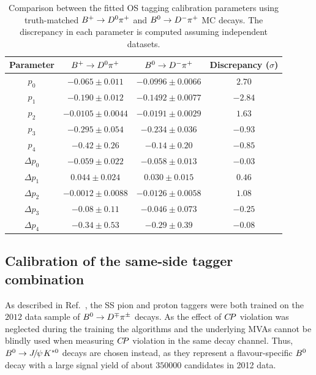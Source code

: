 \begin{table}[t!]
        \centering
        \caption{Comparison between the fitted OS tagging calibration parameters using truth-matched $B^+\rightarrow D^0\pi^+$ and $B^0\rightarrow D^-\pi^+$ MC decays. The discrepancy in each parameter is computed assuming independent datasets.}
        \begin{tabular}{cccc}
          \toprule
          Parameter   &  $B^+\rightarrow D^0\pi^+$   &  $B^0\rightarrow D^-\pi^+$  &   Discrepancy ($\sigma$) \\
          \midrule
          $p_0$   &   $-0.065\pm0.011$   &   $-0.0996\pm0.0066$   &   $2.70$ \\
          $p_1$   &   $-0.190\pm0.012$   &   $-0.1492\pm0.0077$   &   $-2.84$ \\
          $p_2$   &   $-0.0105\pm0.0044$   &   $-0.0191\pm0.0029$   &   $1.63$ \\
          $p_3$   &   $-0.295\pm0.054$   &   $-0.234\pm0.036$   &   $-0.93$ \\
          $p_4$   &   $-0.42\pm0.26$   &   $-0.14\pm0.20$   &   $-0.85$ \\
          $\Delta p_0$   &   $-0.059\pm0.022$   &   $-0.058\pm0.013$   &   $-0.03$ \\
          $\Delta p_1$   &   $0.044\pm0.024$   &   $0.030\pm0.015$   &   $0.46$ \\
          $\Delta p_2$   &   $-0.0012\pm0.0088$   &   $-0.0126\pm0.0058$   &   $1.08$ \\
          $\Delta p_3$   &   $-0.08\pm0.11$   &   $-0.046\pm0.073$   &   $-0.25$ \\
          $\Delta p_4$   &   $-0.34\pm0.53$   &   $-0.29\pm0.39$   &   $-0.08$ \\
          \bottomrule
        \end{tabular}
        \label{tab:os_calib_portability_mc}
\end{table}

\subsection{Calibration of the same-side tagger combination}
\label{sec:tagging:SScalib}

As described in Ref.~\cite{LHCb-PAPER-2016-039}, the SS pion and proton taggers
were both trained on the $\num{2012}$ data sample of
$B^0\rightarrow D^\mp\pi^\pm$ decays. As the effect of $C\!P$ violation was neglected during the
training the algorithms and the underlying MVAs cannot be blindly used when
measuring $C\!P$ violation in the same decay channel. Thus, $\Bz\to\jpsi\Kstarz$
decays are chosen instead, as they represent a flavour-specific $B^0$ decay with
a large signal yield of about $350000$ candidates in 2012 data. 

